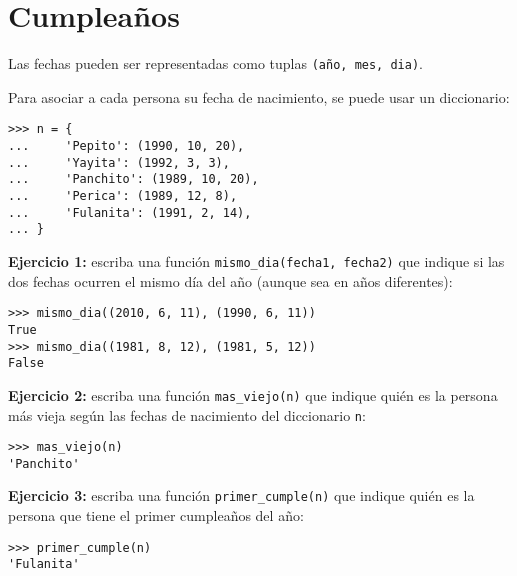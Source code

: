 \section{Cumpleaños}

Las fechas pueden ser representadas como tuplas
\lstinline!(año, mes, dia)!.

Para asociar a cada persona su fecha de nacimiento, se puede usar un
diccionario:

\begin{lstlisting}
>>> n = {
...     'Pepito': (1990, 10, 20),
...     'Yayita': (1992, 3, 3),
...     'Panchito': (1989, 10, 20),
...     'Perica': (1989, 12, 8),
...     'Fulanita': (1991, 2, 14),
... }
\end{lstlisting}

\textbf{Ejercicio 1:} escriba una función
\lstinline!mismo_dia(fecha1, fecha2)! que indique si las dos fechas
ocurren el mismo día del año (aunque sea en años diferentes):

\begin{lstlisting}
>>> mismo_dia((2010, 6, 11), (1990, 6, 11))
True
>>> mismo_dia((1981, 8, 12), (1981, 5, 12))
False
\end{lstlisting}

\textbf{Ejercicio 2:} escriba una función \lstinline!mas_viejo(n)! que
indique quién es la persona más vieja según las fechas de nacimiento del
diccionario \lstinline!n!:

\begin{lstlisting}
>>> mas_viejo(n)
'Panchito'
\end{lstlisting}

\textbf{Ejercicio 3:} escriba una función \lstinline!primer_cumple(n)!
que indique quién es la persona que tiene el primer cumpleaños del año:

\begin{lstlisting}
>>> primer_cumple(n)
'Fulanita'
\end{lstlisting}

